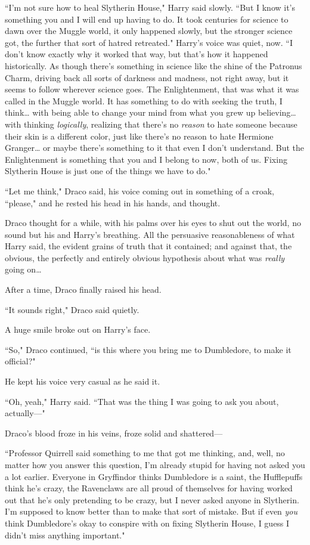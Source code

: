 ``I'm not sure how to heal Slytherin House," Harry said slowly. ``But I know it's something you and I will end up having to do. It took centuries for science to dawn over the Muggle world, it only happened slowly, but the stronger science got, the further that sort of hatred retreated." Harry's voice was quiet, now. ``I don't know exactly why it worked that way, but that's how it happened historically. As though there's something in science like the shine of the Patronus Charm, driving back all sorts of darkness and madness, not right away, but it seems to follow wherever science goes. The Enlightenment, that was what it was called in the Muggle world. It has something to do with seeking the truth, I think{\ldots} with being able to change your mind from what you grew up believing{\ldots} with thinking \emph{logically}, realizing that there's no \emph{reason} to hate someone because their skin is a different color, just like there's no reason to hate Hermione Granger{\ldots} or maybe there's something to it that even I don't understand. But the Enlightenment is something that you and I belong to now, both of us. Fixing Slytherin House is just one of the things we have to do."

``Let me think," Draco said, his voice coming out in something of a croak, ``please," and he rested his head in his hands, and thought.

\later

Draco thought for a while, with his palms over his eyes to shut out the world, no sound but his and Harry's breathing. All the persuasive reasonableness of what Harry said, the evident grains of truth that it contained; and against that, the obvious, the perfectly and entirely obvious hypothesis about what was \emph{really} going on{\ldots}

After a time, Draco finally raised his head.

``It sounds right," Draco said quietly.

A huge smile broke out on Harry's face.

``So," Draco continued, ``is this where you bring me to Dumbledore, to make it official?"

He kept his voice very casual as he said it.

``Oh, yeah," Harry said. ``That was the thing I was going to ask you about, actually—"

Draco's blood froze in his veins, froze solid and shattered—

``Professor Quirrell said something to me that got me thinking, and, well, no matter how you answer this question, I'm already stupid for having not asked you a lot earlier. Everyone in Gryffindor thinks Dumbledore is a saint, the Hufflepuffs think he's crazy, the Ravenclaws are all proud of themselves for having worked out that he's only pretending to be crazy, but I never asked anyone in Slytherin. I'm supposed to know better than to make that sort of mistake. But if even \emph{you} think Dumbledore's okay to conspire with on fixing Slytherin House, I guess I didn't miss anything important."

